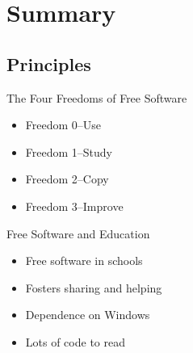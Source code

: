 \section{Summary}\frame{\sectionpage}

\subsection{Principles}
\begin{frame}{The Four Freedoms of Free Software}
  \begin{itemize}
    \item Freedom 0--Use
    \item Freedom 1--Study
    \item Freedom 2--Copy
    \item Freedom 3--Improve
  \end{itemize}
\end{frame}

\begin{frame}{Free Software and Education}
  \begin{itemize}
    \item Free software in schools
    \item Fosters sharing and helping
    \item Dependence on Windows
    \item Lots of code to read
  \end{itemize}
\end{frame}

